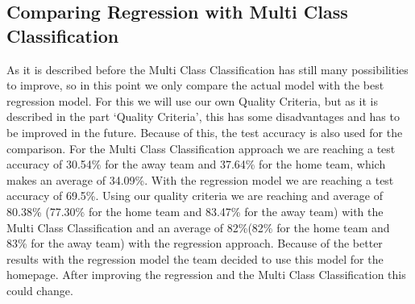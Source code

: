 \subsection{Comparing Regression with Multi Class Classification}
As it is described before the Multi Class Classification has still many possibilities to improve, so in this point we only compare the actual model with the best regression model. For this we will use our own Quality Criteria, but as it is described in the part `Quality Criteria', this has some disadvantages and has to be improved in the future. Because of this, the test accuracy is also used for the comparison. For the Multi Class Classification approach we are reaching a test accuracy of 30.54\% for the away team and 37.64\% for the home team, which makes an average of 34.09\%. With the regression model we are reaching a test accuracy of 69.5\%. Using our quality criteria we are reaching and average of  80.38\% (77.30\% for the home team and 83.47\% for the away team) with the Multi Class Classification and an average of 82\%(82\% for the home team and 83\% for the away team) with the regression approach. Because of the better results with the regression model the team decided to use this model for the homepage. After improving the regression and the Multi Class Classification this could change. 